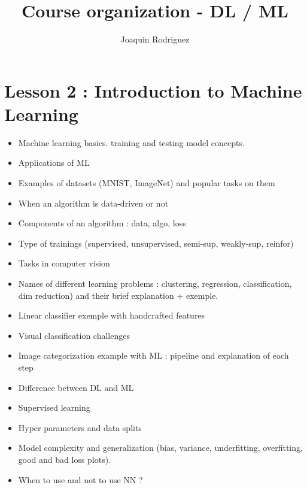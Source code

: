 \documentclass[12pt,a4paper]{article}
\title{Course organization - DL / ML}
\author{Joaquin Rodriguez}
\date{}
\begin{document}
\maketitle

\section*{Lesson 2 : Introduction to Machine Learning}
\begin{itemize}
    \item  Machine learning basics. training and testing model concepts.
    \item  Applications of ML
    \item  Examples of datasets (MNIST, ImageNet) and popular tasks on them
    \item  When an algorithm is data-driven or not
    \item  Components of an algorithm : data, algo, loss
    \item  Type of trainings (supervised, unsupervised, semi-sup, weakly-sup, reinfor)
    \item  Tasks in computer vision
    \item  Names of different learning problems : clustering, regression, classification, dim reduction) and their brief explanation + exemple.
    \item  Linear classifier exemple with handcrafted features
    \item  Visual classification challenges
    \item  Image categorization example with ML : pipeline and explanation of each step
    \item  Difference between DL and ML
    \item  Supervised learning
    \item  Hyper parameters and data splits
    \item  Model complexity and generalization (bias, variance, underfitting, overfitting, good and bad loss plots).
    \item  When to use and not to use NN ?
\end{itemize}
\end{document}
